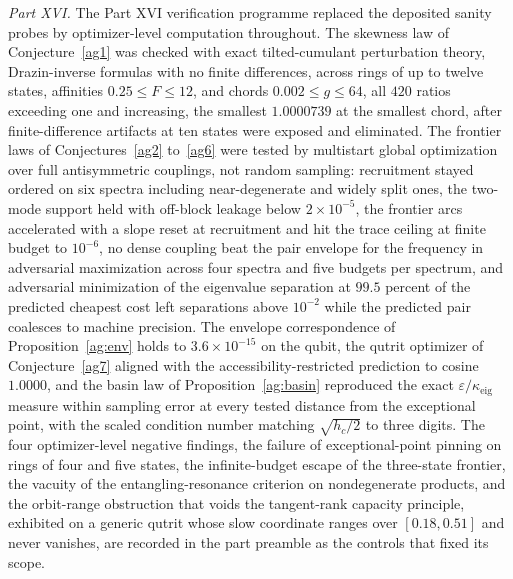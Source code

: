 \documentclass[11pt]{article}
\theoremstyle{definition}
\newcommand{\eps}{\varepsilon}
\begin{document}
\emph{Part XVI.}  The Part XVI verification programme replaced the deposited sanity probes by optimizer-level computation throughout.  The skewness law of Conjecture~\ref{ag1} was checked with exact tilted-cumulant perturbation theory, Drazin-inverse formulas with no finite differences, across rings of up to twelve states, affinities $0.25\le F\le12$, and chords $0.002\le g\le64$, all $420$ ratios exceeding one and increasing, the smallest $1.0000739$ at the smallest chord, after finite-difference artifacts at ten states were exposed and eliminated.  The frontier laws of Conjectures~\ref{ag2} to~\ref{ag6} were tested by multistart global optimization over full antisymmetric couplings, not random sampling: recruitment stayed ordered on six spectra including near-degenerate and widely split ones, the two-mode support held with off-block leakage below $2\times10^{-5}$, the frontier arcs accelerated with a slope reset at recruitment and hit the trace ceiling at finite budget to $10^{-6}$, no dense coupling beat the pair envelope for the frequency in adversarial maximization across four spectra and five budgets per spectrum, and adversarial minimization of the eigenvalue separation at $99.5$ percent of the predicted cheapest cost left separations above $10^{-2}$ while the predicted pair coalesces to machine precision.  The envelope correspondence of Proposition~\ref{ag:env} holds to $3.6\times10^{-15}$ on the qubit, the qutrit optimizer of Conjecture~\ref{ag7} aligned with the accessibility-restricted prediction to cosine $1.0000$, and the basin law of Proposition~\ref{ag:basin} reproduced the exact $\eps/\kappa_{\mathrm{eig}}$ measure within sampling error at every tested distance from the exceptional point, with the scaled condition number matching $\sqrt{h_c/2}$ to three digits.  The four optimizer-level negative findings, the failure of exceptional-point pinning on rings of four and five states, the infinite-budget escape of the three-state frontier, the vacuity of the entangling-resonance criterion on nondegenerate products, and the orbit-range obstruction that voids the tangent-rank capacity principle, exhibited on a generic qutrit whose slow coordinate ranges over $[0.18,0.51]$ and never vanishes, are recorded in the part preamble as the controls that fixed its scope.
\end{document}
